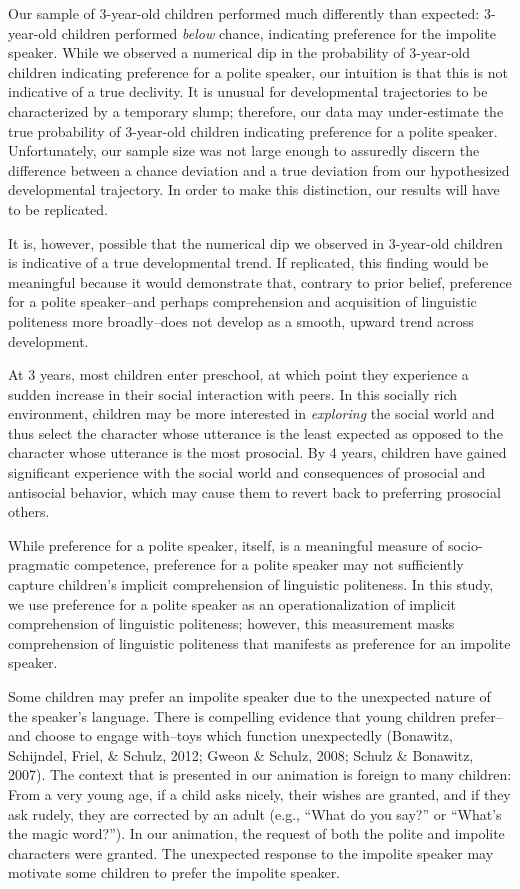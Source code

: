 \documentclass[
  english,
  man,floatsintext]{apa6}
\begin{document}
Our sample of 3-year-old children performed much differently than expected: 3-year-old children performed \emph{below} chance, indicating preference for the impolite speaker. While we observed a numerical dip in the probability of 3-year-old children indicating preference for a polite speaker, our intuition is that this is not indicative of a true declivity. It is unusual for developmental trajectories to be characterized by a temporary slump; therefore, our data may under-estimate the true probability of 3-year-old children indicating preference for a polite speaker. Unfortunately, our sample size was not large enough to assuredly discern the difference between a chance deviation and a true deviation from our hypothesized developmental trajectory. In order to make this distinction, our results will have to be replicated.

It is, however, possible that the numerical dip we observed in 3-year-old children is indicative of a true developmental trend. If replicated, this finding would be meaningful because it would demonstrate that, contrary to prior belief, preference for a polite speaker--and perhaps comprehension and acquisition of linguistic politeness more broadly--does not develop as a smooth, upward trend across development.

At 3 years, most children enter preschool, at which point they experience a sudden increase in their social interaction with peers. In this socially rich environment, children may be more interested in \emph{exploring} the social world and thus select the character whose utterance is the least expected as opposed to the character whose utterance is the most prosocial. By 4 years, children have gained significant experience with the social world and consequences of prosocial and antisocial behavior, which may cause them to revert back to preferring prosocial others.

While preference for a polite speaker, itself, is a meaningful measure of socio-pragmatic competence, preference for a polite speaker may not sufficiently capture children's implicit comprehension of linguistic politeness. In this study, we use preference for a polite speaker as an operationalization of implicit comprehension of linguistic politeness; however, this measurement masks comprehension of linguistic politeness that manifests as preference for an impolite speaker.

Some children may prefer an impolite speaker due to the unexpected nature of the speaker's language. There is compelling evidence that young children prefer--and choose to engage with--toys which function unexpectedly (Bonawitz, Schijndel, Friel, \& Schulz, 2012; Gweon \& Schulz, 2008; Schulz \& Bonawitz, 2007). The context that is presented in our animation is foreign to many children: From a very young age, if a child asks nicely, their wishes are granted, and if they ask rudely, they are corrected by an adult (e.g., ``What do you say?'' or ``What's the magic word?''). In our animation, the request of both the polite and impolite characters were granted. The unexpected response to the impolite speaker may motivate some children to prefer the impolite speaker.
\end{document}
